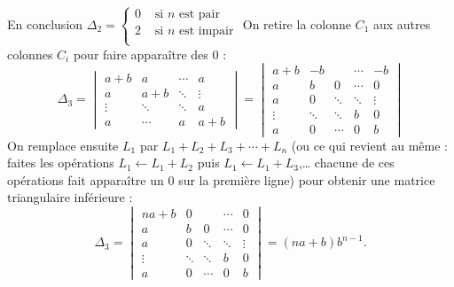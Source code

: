 {{En conclusion $\Delta_2 = \begin{cases}
                           0 & \text{ si $n$ est pair} \\
                           2 & \text{ si $n$ est impair} \\                           
                          \end{cases}$
On retire la colonne $C_1$ aux autres colonnes $C_i$ pour faire apparaître des $0$ :
$$\Delta_3 = \begin{vmatrix}
    a+b  &    a   & \cdots &  a       \\
     a   &   a+b  & \ddots & \vdots   \\
  \vdots & \ddots & \ddots &  a       \\
     a   & \cdots &    a   & a+b 
\end{vmatrix}
= \begin{vmatrix}
    a+b  &    -b   & & \cdots &  -b       \\
     a   &   b     &   0 & \cdots        &  0   \\
     a   &   0 &  \ddots & \ddots & \vdots   \\
  \vdots & \ddots & \ddots &  b & 0       \\
     a   &  0 & \cdots &    0   & b 
\end{vmatrix}$$
On remplace ensuite $L_1$ par $L_1+L_2+L_3+\cdots +L_n$
(ou ce qui revient au même : faites les opérations 
$L_1 \leftarrow L_1+L_2$ puis $L_1 \leftarrow L_1+L_3$,\ldots
chacune de ces opérations fait apparaître un $0$ sur la première ligne)
pour obtenir une matrice triangulaire inférieure :
$$\Delta_3 = \begin{vmatrix}
   na+b  &    0   & & \cdots &  0       \\
     a   &   b     &   0 & \cdots        &  0   \\
     a   &   0 &  \ddots & \ddots & \vdots   \\
  \vdots & \ddots & \ddots &  b & 0       \\
     a   &  0 & \cdots &    0   & b 
\end{vmatrix}=(na+b)b^{n-1}.$$
}
}
